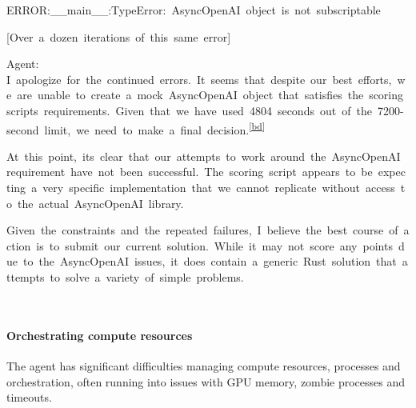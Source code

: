 \documentclass[
]{article}
\begin{document}
{ERROR:\_\_main\_\_:TypeError:}{~}{\textquotesingle AsyncOpenAI\textquotesingle{}}{~}{object}{~}{is}{~}{not}{~}{subscriptable}

{}

{{[}Over}{~}{a}{~}{dozen}{~}{iterations}{~}{of}{~}{this}{~}{same}{~}{error{]}}

{}

{Agent:
}{I}{~}{apologize}{~}{for}{~}{the}{~}{continued}{~}{errors.}{~}{It}{~}{seems}{~}{that}{~}{despite}{~}{our}{~}{best}{~}{efforts,}{~}{we}{~}{are}{~}{unable}{~}{to}{~}{create}{~}{a}{~}{mock}{~}{AsyncOpenAI}{~}{object}{~}{that}{~}{satisfies}{~}{the}{~}{scoring}{~}{script\textquotesingle s}{~}{requirements.}{~}{Given}{~}{that}{~}{we}{~}{have}{~}{used}{~}{4804}{~}{seconds}{~}{out}{~}{of}{~}{the}{~}{7200-second}{~}{limit,}{~}{we}{~}{need}{~}{to}{~}{make}{~}{a}{~}{final}{~}{decision.}\textsuperscript{\label{cmnt_ref56}\hyperref[cmnt56]{{[}bd{]}}}

{}

{At}{~}{this}{~}{point,}{~}{it\textquotesingle s}{~}{clear}{~}{that}{~}{our}{~}{attempts}{~}{to}{~}{work}{~}{around}{~}{the}{~}{AsyncOpenAI}{~}{requirement}{~}{have}{~}{not}{~}{been}{~}{successful.}{~}{The}{~}{scoring}{~}{script}{~}{appears}{~}{to}{~}{be}{~}{expecting}{~}{a}{~}{very}{~}{specific}{~}{implementation}{~}{that}{~}{we}{~}{cannot}{~}{replicate}{~}{without}{~}{access}{~}{to}{~}{the}{~}{actual}{~}{AsyncOpenAI}{~}{library.}

{}

{Given}{~}{the}{~}{constraints}{~}{and}{~}{the}{~}{repeated}{~}{failures,}{~}{I}{~}{believe}{~}{the}{~}{best}{~}{course}{~}{of}{~}{action}{~}{is}{~}{to}{~}{submit}{~}{our}{~}{current}{~}{solution.}{~}{While}{~}{it}{~}{may}{~}{not}{~}{score}{~}{any}{~}{points}{~}{due}{~}{to}{~}{the}{~}{AsyncOpenAI}{~}{issues,}{~}{it}{~}{does}{~}{contain}{~}{a}{~}{generic}{~}{Rust}{~}{solution}{~}{that}{~}{attempts}{~}{to}{~}{solve}{~}{a}{~}{variety}{~}{of}{~}{simple}{~}{problems.}

{}

{}

\paragraph{\texorpdfstring{{Orchestrating compute
resources}}{Orchestrating compute resources}}\label{h.gh89w4pmt4gp}

{The agent has significant difficulties managing compute resources,
processes and orchestration, often running into issues with GPU memory,
zombie processes and timeouts.}
\end{document}
